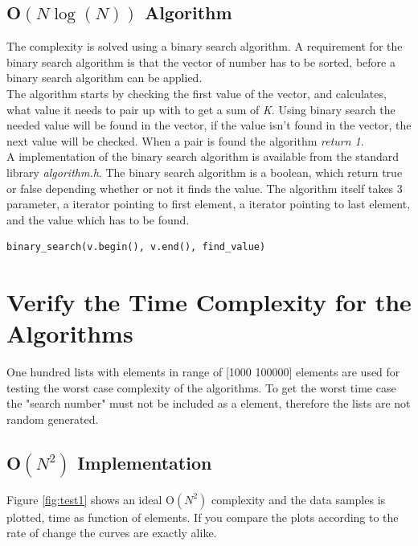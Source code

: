 \subsection{O\(\left( N\log {(N)}  \right) \) Algorithm}
\label{sec:algorithm2}
The complexity is solved using a binary search algorithm. A requirement for the binary search algorithm is that the vector of number has to be sorted, before a binary search algorithm can be applied. \\
The algorithm starts by checking the first value of the vector, and calculates, what value it needs to pair up with to get a sum of \emph{K}.  Using binary search the needed value will be found in the vector, if the value isn't found in the vector, the next value will be checked.  When a pair is found the algorithm \emph{return 1}. \\

A implementation of the binary search algorithm is available from the standard library \emph{algorithm.h}. The binary search algorithm is a boolean, which return true or false depending whether or not it finds the value. The algorithm itself takes 3 parameter, a iterator pointing to first element, a iterator pointing to last element, and the value which has to be found. 
\begin{lstlisting}
binary_search(v.begin(), v.end(), find_value)
\end{lstlisting}

\newpage
\section{Verify the Time Complexity for the Algorithms}
\label{sec:ver}
One hundred lists with elements in range of [1000 100000] elements are used for testing the worst case complexity of the algorithms. To get the worst time case the "search number" must not be included as a element, therefore the lists are not random generated. 


\subsection{O\(\left( { N }^{ 2 } \right)\) Implementation}
Figure \ref{fig:test1} shows an ideal O\(\left( { N }^{ 2 } \right)\) complexity and the data samples is plotted, time as function of elements. If you compare the plots according to the rate of change the curves are exactly alike. \\

